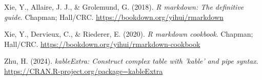 \documentclass[
  stu,floatsintext]{apa7}
\newlength{\cslhangindent}
\newenvironment{CSLReferences}[2] %
 {\begin{list}{}{%
  \setlength{\itemindent}{0pt}
  \setlength{\leftmargin}{0pt}
  \setlength{\parsep}{0pt}
  \ifodd #1
   \setlength{\leftmargin}{\cslhangindent}
   \setlength{\itemindent}{-1\cslhangindent}
  \fi
  \setlength{\itemsep}{#2\baselineskip}}}
 {\end{list}}
\begin{document}
\begin{CSLReferences}{1}{0}
Xie, Y., Allaire, J. J., \& Grolemund, G. (2018). \emph{R markdown: The definitive guide}. Chapman; Hall/CRC. \url{https://bookdown.org/yihui/rmarkdown}

Xie, Y., Dervieux, C., \& Riederer, E. (2020). \emph{R markdown cookbook}. Chapman; Hall/CRC. \url{https://bookdown.org/yihui/rmarkdown-cookbook}

Zhu, H. (2024). \emph{kableExtra: Construct complex table with 'kable' and pipe syntax}. \url{https://CRAN.R-project.org/package=kableExtra}

\end{CSLReferences}


\clearpage
\renewcommand{\listfigurename}{Figure captions}

\clearpage
\renewcommand{\listtablename}{Table captions}
\end{document}
